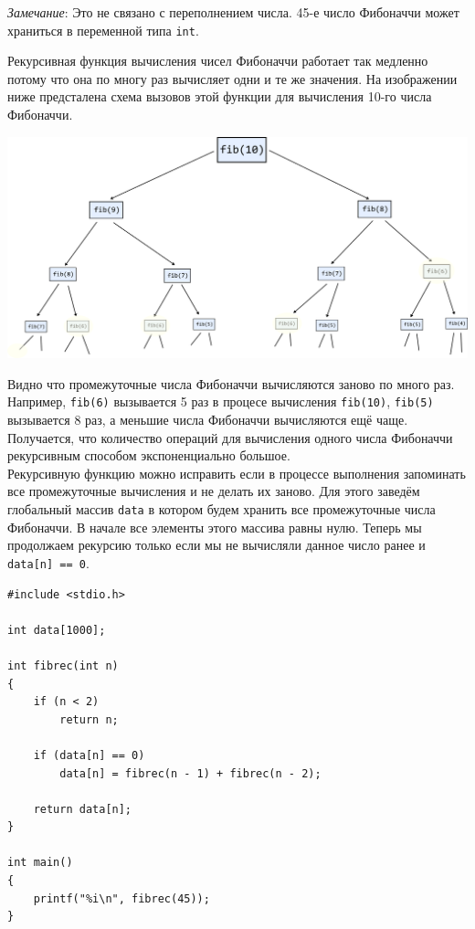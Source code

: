 \documentclass{article}
\begin{document}
\begin{itemize}
\textit{Замечание}: Это не связано с переполнением числа. 45-е число Фибоначчи может храниться в переменной типа \texttt{int}.


\newpage
Рекурсивная функция вычисления чисел Фибоначчи работает так медленно потому что она по многу раз вычисляет одни и те же значения. На изображении ниже предсталена схема вызовов этой функции для вычисления 10-го числа Фибоначчи.
\begin{center}
\includegraphics[scale=0.8]{../images/fib.png}
\end{center}
Видно что промежуточные числа Фибоначчи вычисляются заново по много раз. Например, \texttt{fib(6)} вызывается 5 раз в процесе вычисления \texttt{fib(10)}, \texttt{fib(5)} вызывается 8 раз, а меньшие числа Фибоначчи вычисляются ещё чаще. Получается, что количество операций для вычисления одного числа Фибоначчи рекурсивным способом экспоненциально большое.\\

Рекурсивную функцию можно исправить если в процессе выполнения запоминать все промежуточные вычисления и не делать их заново. Для этого заведём глобальный массив \texttt{data} в котором будем хранить все промежуточные числа Фибоначчи. В начале все элементы этого массива равны нулю. Теперь мы продолжаем рекурсию только если мы не вычисляли данное число ранее и \texttt{data[n] == 0}.

\begin{lstlisting}
#include <stdio.h>

int data[1000];

int fibrec(int n) 
{
    if (n < 2)
        return n;

    if (data[n] == 0)
        data[n] = fibrec(n - 1) + fibrec(n - 2);

    return data[n];
}

int main() 
{
    printf("%i\n", fibrec(45));
}
\end{lstlisting}

\end{itemize}
\end{document}

